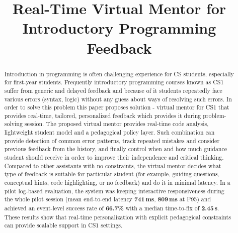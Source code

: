 \documentclass[conference]{IEEEtran}
\begin{document}
\title{Real-Time Virtual Mentor for Introductory Programming Feedback}

\author{
    \and
    
}



\maketitle

\begin{abstract}
Introduction in programming is often challenging experience for CS students, especially for first-year students. Frequently introductory programming courses known as CS1 suffer from generic and delayed feedback and because of it students repeatedly face various errors (syntax, logic) without any guess about ways of resolving such errors. 
In order to solve this problem this paper proposes solution - virtual mentor for CS1 that provides real-time, tailored, personalized feedback which provides it during problem-solving session. The proposed virtual mentor provides real-time code analysis, lightweight student model and a pedagogical policy layer. Such combination can provide detection of common error patterns, track repeated mistakes and consider previous feedback from the history, and finally control when and how much guidance student should receive in order to improve their independence and critical thinking. Compared to other assistants with no constraints, the virtual mentor decides what type of feedback is suitable for particular student (for example, guiding questions, conceptual hints, code highlighting, or no feedback) and do it in minimal latency. In a pilot log-based evaluation, the system was keeping interactive responsiveness during the whole pilot session (mean end-to-end latency \textbf{741\,ms}, \textbf{809\,ms} at P95) and achieved an event-level success rate of \textbf{66.7\%} with a median time-to-fix of \textbf{2.45\,s}. These results show that real-time personalization with explicit pedagogical constraints can provide scalable support in CS1 settings.
\end{abstract}
\end{document}
